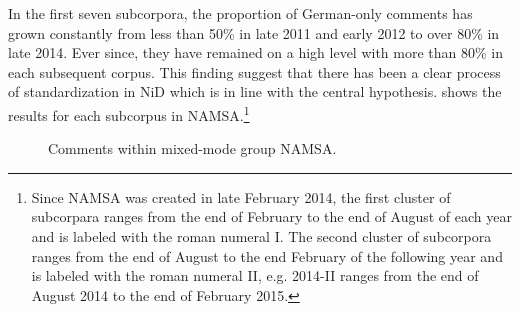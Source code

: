 \documentclass[output=paper]{langsci/langscibook}
\begin{document}
In the first seven subcorpora, the proportion of German-only comments has grown constantly from less than 50\% in late 2011 and early 2012 to over 80\% in late 2014. Ever since, they have remained on a high level with more than 80\% in each subsequent corpus. This finding suggest that there has been a clear process of standardization in NiD which is in line with the central hypothesis.  shows the results for each subcorpus in NAMSA.\footnote{Since NAMSA was created in late February 2014, the first cluster of subcorpara ranges from the end of February to the end of August of each year and is labeled with the roman numeral I. The second cluster of subcorpora ranges from the end of August to the end February of the following year and is labeled with the roman numeral II, e.g. 2014-II ranges from the end of August 2014 to the end of February 2015.} 

  \begin{figure}
\caption{Comments within mixed-mode group NAMSA.}
\label{fig:radke:7}
\end{figure}  
\end{document}
